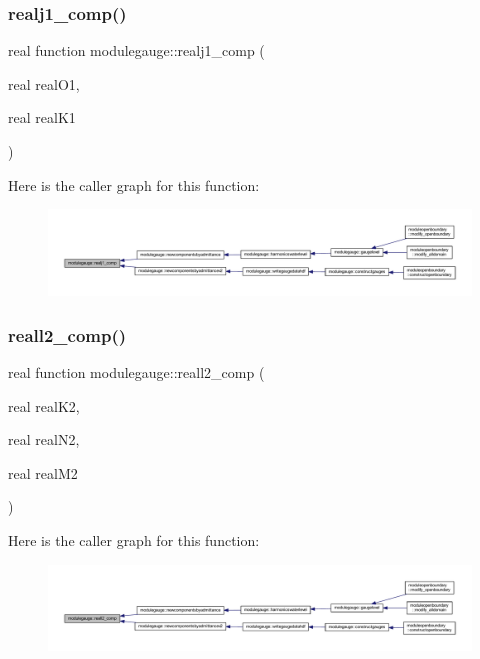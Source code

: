 \subsubsection{\texorpdfstring{realj1\+\_\+comp()}{realj1\_comp()}}
{\footnotesize\ttfamily real function modulegauge\+::realj1\+\_\+comp (\begin{DoxyParamCaption}\item[{real}]{real\+O1,  }\item[{real}]{real\+K1 }\end{DoxyParamCaption})\hspace{0.3cm}{\ttfamily [private]}}

Here is the caller graph for this function\+:\nopagebreak
\begin{figure}[H]
\begin{center}
\leavevmode
\includegraphics[width=350pt]{namespacemodulegauge_a48b5405cff2ce5a1d7821cc09cd69260_icgraph}
\end{center}
\end{figure}
\mbox{\label{namespacemodulegauge_ae24e18d5af2b616f42c314149246cef5}} 
\subsubsection{\texorpdfstring{reall2\+\_\+comp()}{reall2\_comp()}}
{\footnotesize\ttfamily real function modulegauge\+::reall2\+\_\+comp (\begin{DoxyParamCaption}\item[{real}]{real\+K2,  }\item[{real}]{real\+N2,  }\item[{real}]{real\+M2 }\end{DoxyParamCaption})\hspace{0.3cm}{\ttfamily [private]}}

Here is the caller graph for this function\+:\nopagebreak
\begin{figure}[H]
\begin{center}
\leavevmode
\includegraphics[width=350pt]{namespacemodulegauge_ae24e18d5af2b616f42c314149246cef5_icgraph}
\end{center}
\end{figure}
\mbox{\label{namespacemodulegauge_aa12106b28d4813b546feb45a0408ffa0}} 
